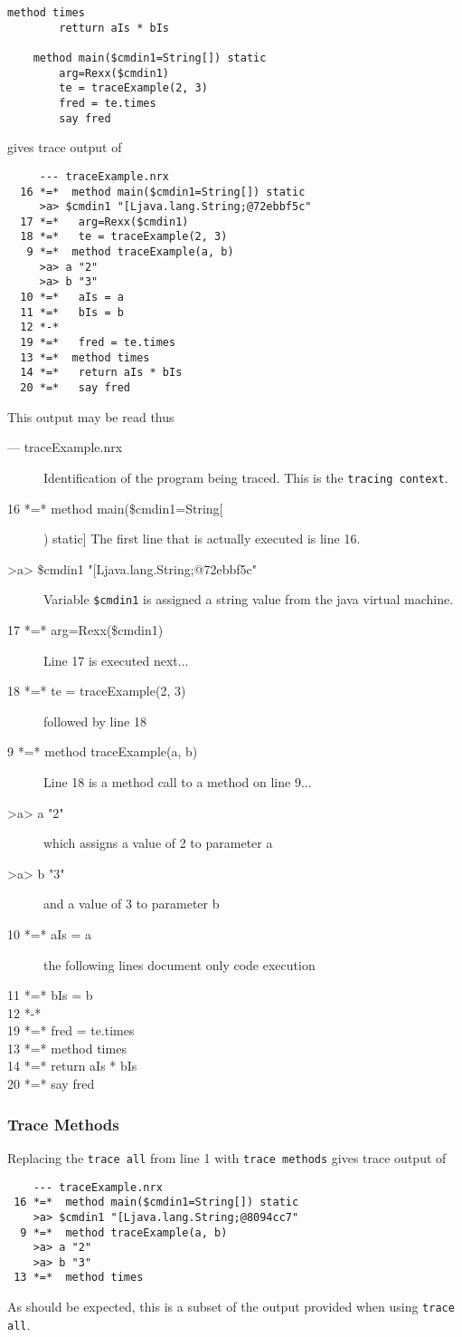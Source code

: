 {\begin{lstlisting}[label=Trace1, caption=Trace Example 1]
	method times
		retturn aIs * bIs

	method main($cmdin1=String[]) static
		arg=Rexx($cmdin1)
		te = traceExample(2, 3)
		fred = te.times
		say fred
\end{lstlisting}
gives trace output of
\begin{verbatim}
     --- traceExample.nrx 
  16 *=*  method main($cmdin1=String[]) static
     >a> $cmdin1 "[Ljava.lang.String;@72ebbf5c" 
  17 *=*   arg=Rexx($cmdin1)
  18 *=*   te = traceExample(2, 3)
   9 *=*  method traceExample(a, b)
     >a> a "2" 
     >a> b "3" 
  10 *=*   aIs = a
  11 *=*   bIs = b
  12 *-* 
  19 *=*   fred = te.times
  13 *=*  method times
  14 *=*   return aIs * bIs
  20 *=*   say fred
\end{verbatim}
This output may be read thus
\begin{description}
\item[\hphantom{111}--- traceExample.nrx] Identification of the program being traced. This is the \texttt{tracing context}.
\item[16 *=*  method main(\$cmdin1=String[]) static] The first line that is actually executed is line 16.
\item[\hphantom{111}>a> \$cmdin1 "[Ljava.lang.String;@72ebbf5c"] Variable \texttt{\$cmdin1} is assigned a string value from the java virtual machine.
\item[17 *=*   arg=Rexx(\$cmdin1)]Line 17 is executed next...
\item[18 *=*   te = traceExample(2, 3)] followed by line 18
\item[\hphantom{1}9 *=*  method traceExample(a, b)] Line 18 is a method call to a method on line 9...
\item[\hphantom{111}>a> a "2"] which assigns a value of 2 to parameter a
\item[\hphantom{111}>a> b "3"] and a value of 3 to parameter b
\item[10 *=*   aIs = a] the following lines document only code execution
\item[11 *=*   bIs = b] 
\item[12 *-*] 
\item[19 *=*   fred = te.times]
\item[13 *=*  method times]
\item[14 *=*   return aIs * bIs]
\item[20 *=*   say fred]
\end{description}

\subsubsection{Trace Methods}
Replacing the \texttt{trace all} from line 1 with \texttt{trace methods} gives trace output of
\begin{verbatim}
    --- traceExample.nrx 
 16 *=*  method main($cmdin1=String[]) static
    >a> $cmdin1 "[Ljava.lang.String;@8094cc7" 
  9 *=*  method traceExample(a, b)
    >a> a "2" 
    >a> b "3" 
 13 *=*  method times
\end{verbatim}
As should be expected, this is a subset of the output provided when using \texttt{trace all}.
}
